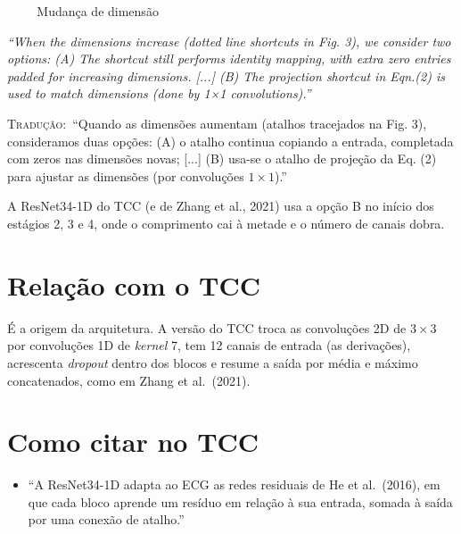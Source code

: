 \documentclass[11pt,a4paper]{article}
\newcommand{\pagechip}[1]{{\setlength{\fboxsep}{1.5pt}\colorbox{cAcc}{\textcolor{white}{\scriptsize\texttt{#1}}}}}
\newenvironment{origquote}{\par\itshape\small}{\par}
\newenvironment{tradquote}{\par\small\textsc{Tradução:}\ }{\par}
\newcommand{\explab}[1]{\par\smallskip{\small\color{cAcc}\textbf{\MakeUppercase{#1}}}\par}
\begin{document}
\begin{citacard}{\pagechip{p. 4} Mudança de dimensão}
\begin{origquote}“When the dimensions increase (dotted line shortcuts in Fig. 3), we consider two options: (A) The shortcut still performs identity mapping, with extra zero entries padded for increasing dimensions. [...] (B) The projection shortcut in Eqn.(2) is used to match dimensions (done by 1×1 convolutions).”\end{origquote}
\begin{tradquote}“Quando as dimensões aumentam (atalhos tracejados na Fig. 3), consideramos duas opções: (A) o atalho continua copiando a entrada, completada com zeros nas dimensões novas; [...] (B) usa-se o atalho de projeção da Eq. (2) para ajustar as dimensões (por convoluções $1 \times 1$).”\end{tradquote}
\explab{Explicação}
A ResNet34-1D do TCC (e de Zhang et al., 2021) usa a opção B no início dos estágios 2, 3 e 4, onde o comprimento cai à metade e o número de canais dobra.
\end{citacard}

\section{Relação com o TCC}
É a origem da arquitetura. A versão do TCC troca as convoluções 2D de $3 \times 3$ por convoluções 1D de \textit{kernel} 7, tem 12 canais de entrada (as derivações), acrescenta \textit{dropout} dentro dos blocos e resume a saída por média e máximo concatenados, como em Zhang et al.\ (2021).

\section{Como citar no TCC}
\begin{itemize}
\item ``A ResNet34-1D adapta ao ECG as redes residuais de He et al.\ (2016), em que cada bloco aprende um resíduo em relação à sua entrada, somada à saída por uma conexão de atalho.''
\end{itemize}
\end{document}
